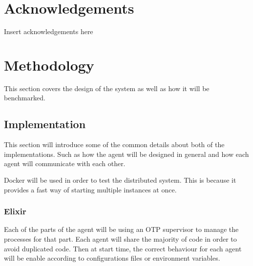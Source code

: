 \documentclass[12pt,a4paper]{article}
\begin{document}

\pagebreak

\pagebreak

\pagebreak

\begin{abstract}
\end{abstract}
\pagebreak

\tableofcontents
\newpage

\listoffigures
\newpage

\renewcommand\lstlistlistingname{List of Listings}
\lstlistoflistings{}
\newpage

\listoftables
\newpage

\section*{Acknowledgements}
Insert acknowledgements here
\subsection*{}
\newpage





\section{Methodology}

This section covers the design of the system as well as how it will be benchmarked.

\subsection{Implementation}

This section will introduce some of the common details about both of the implementations.
Such as how the agent will be designed in general and how each agent will communicate with each other.

Docker will be used in order to test the distributed system.
This is because it provides a fast way of starting multiple instances at once.

\subsubsection{Elixir}

Each of the parts of the agent will be using an OTP supervisor to manage the processes for that part.
Each agent will share the majority of code in order to avoid duplicated code.
Then at start time, the correct behaviour for each agent will be enable according to configurations files or environment variables.
\end{document}
